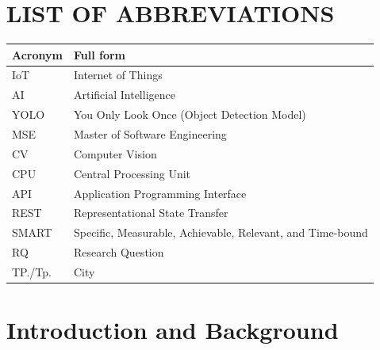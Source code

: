 \documentclass[12pt,a4paper]{article}
\begin{document}
\newpage

\tableofcontents
\newpage

\section*{LIST OF ABBREVIATIONS}

\begin{longtable}{|p{3cm}|p{12cm}|}
\hline
\textbf{Acronym} & \textbf{Full form} \\
\hline
\endhead
IoT & Internet of Things \\ \hline
AI & Artificial Intelligence \\ \hline
YOLO & You Only Look Once (Object Detection Model) \\ \hline
MSE & Master of Software Engineering \\ \hline
CV & Computer Vision \\ \hline
CPU & Central Processing Unit \\ \hline
API & Application Programming Interface \\ \hline
REST & Representational State Transfer \\ \hline
SMART & Specific, Measurable, Achievable, Relevant, and Time-bound \\ \hline
RQ & Research Question \\ \hline
TP./Tp. & City \\
\hline
\end{longtable}

\newpage
\section{Introduction and Background}
\end{document}

